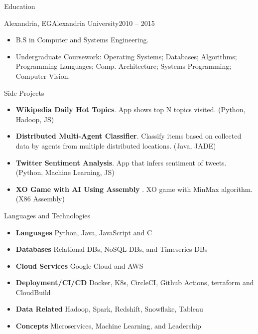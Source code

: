 \documentclass[]{ahmedamrcv_saudi}
\begin{document}
	\begin{cvsection}{Education}
		\begin{cvsubsection}{Alexandria, EG}{Alexandria University}{2010 -- 2015}
			\begin{itemize}
				\item B.S in Computer and Systems Engineering.
				\item Undergraduate Coursework: Operating Systems; Databases; Algorithms; Programming Languages; Comp. Architecture; Systems Programming; Computer Vision.
			\end{itemize}
		\end{cvsubsection}
	\end{cvsection}
	
	\begin{cvsection}{Side Projects}
		\begin{cvsubsection}{}{}{}
			\begin{itemize}
    			\item \textbf{Wikipedia Daily Hot Topics}. App shows top N topics visited. (Python, Hadoop, JS)
				\item \textbf{Distributed Multi-Agent Classifier}. Classify items based on collected data by agents from multiple distributed locations. (Java, JADE)
				\item \textbf{Twitter Sentiment Analysis}. App that infers sentiment of tweets. (Python, Machine Learning, JS)
				\item \textbf{XO Game with AI Using Assembly }. XO game with MinMax algorithm. (X86 Assembly)
			\end{itemize}
		\end{cvsubsection}
	\end{cvsection}
	

	\begin{cvsection}{Languages and Technologies}
		\begin{cvsubsection}{}{}{}	
			\begin{itemize}
				\item \textbf{Languages} Python, Java, JavaScript and C
				\item \textbf{Databases}  Relational DBs, NoSQL DBs, and Timeseries DBs
				\item \textbf{Cloud Services}  Google Cloud and AWS
				\item \textbf{Deployment/CI/CD}  Docker, K8s, CircleCI, Github Actions, terraform and CloudBuild
				\item \textbf{Data Related}  Hadoop, Spark, Redshift, Snowflake, Tableau
				\item \textbf{Concepts}  Microservices, Machine Learning, and Leadership
			\end{itemize}
		\end{cvsubsection}
	\end{cvsection}
\end{document}
